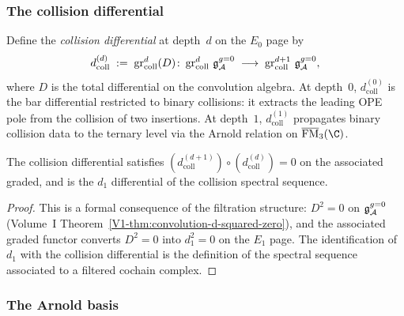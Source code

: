 \subsubsection{The collision differential}

\begin{definition}
Define the \emph{collision differential} at depth~$d$ on the
$E_0$ page by
\begin{equation}%
d_{\mathrm{coll}}^{(d)}
\;:=\;
\grcoll^d(D)\colon
\grcoll^d\,\mathfrak{g}^{g{=}0}_\cA
\;\longrightarrow\;
\grcoll^{d+1}\,\mathfrak{g}^{g{=}0}_\cA,
\end{equation}
where $D$ is the total differential on the convolution algebra.
At depth~$0$, $d_{\mathrm{coll}}^{(0)}$ is the bar differential
restricted to binary collisions: it extracts the leading OPE pole
from the collision of two insertions.
At depth~$1$, $d_{\mathrm{coll}}^{(1)}$ propagates binary collision
data to the ternary level via the Arnold relation on
$\FM_3(\C)$.
\end{definition}

\begin{lemma}
The collision differential satisfies
$(d_{\mathrm{coll}}^{(d+1)}) \circ (d_{\mathrm{coll}}^{(d)}) = 0$
on the associated graded, and is the $d_1$ differential of the
collision spectral sequence.
\end{lemma}

\begin{proof}
This is a formal consequence of the filtration structure:
$D^2 = 0$ on $\mathfrak{g}^{g{=}0}_{\mathcal{A}}$
(Volume~I Theorem~\ref{V1-thm:convolution-d-squared-zero}), and the associated
graded functor converts $D^2 = 0$ into
$d_1^2 = 0$ on the $E_1$ page. The identification of
$d_1$ with the collision differential is the definition of the
spectral sequence associated to a filtered cochain complex.
\end{proof}


\subsubsection{The Arnold basis}

